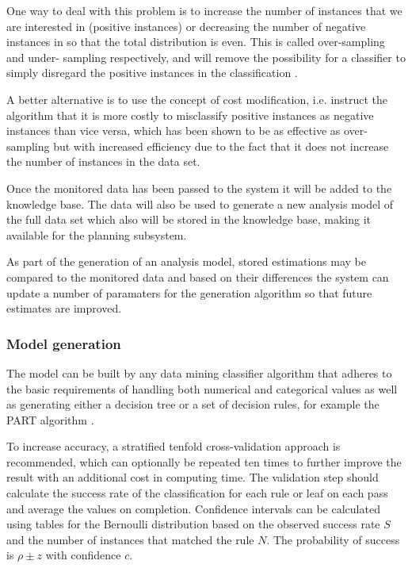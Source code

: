 \documentclass[a4paper]{article}
\begin{document}
One way to deal with this problem is to increase the number of instances that we are interested in (positive instances) or decreasing the number of negative instances in so that the total distribution is even. This is called over-sampling and under- sampling respectively, and will remove the possibility for a classifier to simply disregard the positive instances in the classification \citep{Chawla2004, Japkowicz2002}.

A better alternative is to use the concept of cost modification, i.e. instruct the algorithm that it is more costly to misclassify positive instances as negative instances than vice versa, which has been shown to be as effective as over-sampling but with increased efficiency \citep{Chawla2004, Japkowicz2002} due to the fact that it does not increase the number of instances in the data set.

Once the monitored data has been passed to the system it will be added to the knowledge base. The data will also be used to  generate a new analysis model of the full data set which also will be stored in the knowledge base, making it available for the planning subsystem.

As part of the generation of an analysis model, stored estimations may be compared to the monitored data and based on their differences the system can update a number of paramaters for the generation algorithm so that future estimates are improved.

\subsubsection{Model generation}
The model can be built by any data mining classifier algorithm that adheres to the basic requirements of handling both numerical  and categorical values as well as generating either a decision tree or a set of decision rules, for example the PART algorithm  \citep{Frank1998}.

To increase accuracy, a stratified tenfold cross-validation approach is recommended, which can optionally be repeated ten times to further improve the result with an additional cost in computing time. The validation step should calculate the success rate of the classification for each rule or leaf on each pass and average the values on completion. Confidence intervals can be calculated using tables for the Bernoulli distribution \citep[chap. 5]{Witten2011} based on the observed success rate \(S\) and the  number of instances that matched the rule \(N\). The probability of success is \(\rho \pm z\) with confidence \(c\).
\end{document}
